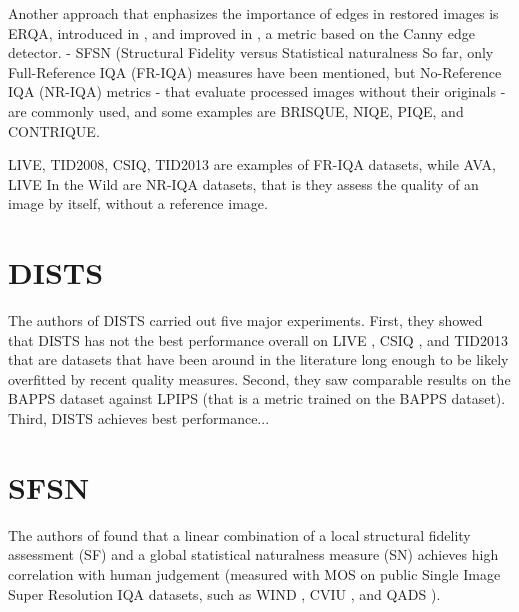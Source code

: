 Another approach that enphasizes the importance of edges in restored images is ERQA, introduced in \cite{kirillova2021erqa}, and improved in \cite{lyapustin2022towards}, a metric based on the Canny edge detector.
- SFSN (Structural Fidelity versus Statistical naturalness \cite{zhou2021image}
So far, only Full-Reference IQA (FR-IQA) measures have been mentioned, but No-Reference IQA (NR-IQA) metrics - that evaluate processed images without their originals - are commonly used, and some examples are BRISQUE, NIQE, PIQE, and CONTRIQUE.


LIVE, TID2008, CSIQ, TID2013 are examples of FR-IQA datasets, while AVA, LIVE In the Wild are NR-IQA datasets, that is they assess the quality of an image by itself, without a reference image.






\section{DISTS}
\label{sec:dists}
The authors of DISTS \cite{} carried out five major experiments. First, they showed that DISTS has not the best performance overall on LIVE \cite{}, CSIQ \cite{}, and TID2013 \cite{} that are datasets that have been around in the literature long enough to be likely overfitted by recent quality measures. Second, they saw comparable results on the BAPPS dataset against LPIPS (that is a metric trained on the BAPPS dataset). Third, DISTS achieves best performance...

\section{SFSN}
\label{sec:sfsn}
The authors of \cite{zhou2021image} found that a linear combination of a local structural fidelity assessment (SF) and a global statistical naturalness measure (SN) achieves high correlation with human judgement (measured with MOS on public Single Image Super Resolution IQA datasets, such as WIND \cite{yeganeh2015objective}, CVIU \cite{ma2017learning}, and QADS \cite{zhou2019visual}).

